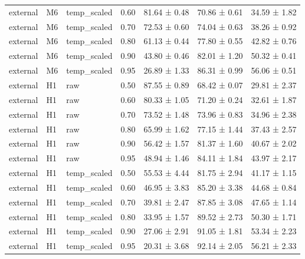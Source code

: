 \begin{tabular}{lllrlll}
external & M6 & temp\_scaled & 0.60 & 81.64 ± 0.48 & 70.86 ± 0.61 & 34.59 ± 1.82 \\
external & M6 & temp\_scaled & 0.70 & 72.53 ± 0.60 & 74.04 ± 0.63 & 38.26 ± 0.92 \\
external & M6 & temp\_scaled & 0.80 & 61.13 ± 0.44 & 77.80 ± 0.55 & 42.82 ± 0.76 \\
external & M6 & temp\_scaled & 0.90 & 43.80 ± 0.46 & 82.01 ± 1.20 & 50.32 ± 0.41 \\
external & M6 & temp\_scaled & 0.95 & 26.89 ± 1.33 & 86.31 ± 0.99 & 56.06 ± 0.51 \\
external & H1 & raw & 0.50 & 87.55 ± 0.89 & 68.42 ± 0.07 & 29.81 ± 2.37 \\
external & H1 & raw & 0.60 & 80.33 ± 1.05 & 71.20 ± 0.24 & 32.61 ± 1.87 \\
external & H1 & raw & 0.70 & 73.52 ± 1.48 & 73.96 ± 0.83 & 34.96 ± 2.38 \\
external & H1 & raw & 0.80 & 65.99 ± 1.62 & 77.15 ± 1.44 & 37.43 ± 2.57 \\
external & H1 & raw & 0.90 & 56.42 ± 1.57 & 81.37 ± 1.60 & 40.67 ± 2.02 \\
external & H1 & raw & 0.95 & 48.94 ± 1.46 & 84.11 ± 1.84 & 43.97 ± 2.17 \\
external & H1 & temp\_scaled & 0.50 & 55.53 ± 4.44 & 81.75 ± 2.94 & 41.17 ± 1.15 \\
external & H1 & temp\_scaled & 0.60 & 46.95 ± 3.83 & 85.20 ± 3.38 & 44.68 ± 0.84 \\
external & H1 & temp\_scaled & 0.70 & 39.81 ± 2.47 & 87.85 ± 3.08 & 47.65 ± 1.14 \\
external & H1 & temp\_scaled & 0.80 & 33.95 ± 1.57 & 89.52 ± 2.73 & 50.30 ± 1.71 \\
external & H1 & temp\_scaled & 0.90 & 27.06 ± 2.91 & 91.05 ± 1.81 & 53.34 ± 2.23 \\
external & H1 & temp\_scaled & 0.95 & 20.31 ± 3.68 & 92.14 ± 2.05 & 56.21 ± 2.33 \\
\bottomrule
\end{tabular}
